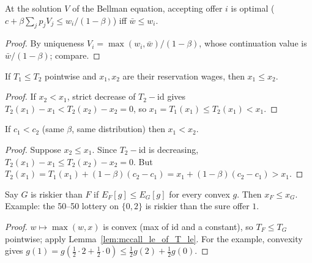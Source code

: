 \begin{theorem}
\label{thm:mccall_accept_iff}
\leanok
{}
At the solution $V$ of the Bellman equation, accepting offer $i$ is optimal
($c + \beta\sum_j p_j V_j \le w_i/(1-\beta)$) iff $\bar w \le w_i$.
\end{theorem}
\begin{proof}
\leanok
By uniqueness $V_i = \max(w_i, \bar w)/(1-\beta)$, whose continuation value is $\bar w/(1-\beta)$; compare.
\end{proof}

\begin{lemma}
\label{lem:mccall_le_of_T_le}
\leanok
{}
If $T_1 \le T_2$ pointwise and $x_1, x_2$ are their reservation wages, then $x_1 \le x_2$.
\end{lemma}
\begin{proof}
\leanok
If $x_2 < x_1$, strict decrease of $T_2 - \mathrm{id}$ gives $T_2(x_1) - x_1 < T_2(x_2) - x_2 = 0$, so
$x_1 = T_1(x_1) \le T_2(x_1) < x_1$.
\end{proof}

\begin{theorem}
\label{thm:mccall_strictMono_c}
\leanok
{}
If $c_1 < c_2$ (same $\beta$, same distribution) then $x_1 < x_2$.
\end{theorem}
\begin{proof}
\leanok
Suppose $x_2 \le x_1$. Since $T_2 - \mathrm{id}$ is decreasing, $T_2(x_1) - x_1 \le T_2(x_2) - x_2 = 0$. But
$T_2(x_1) = T_1(x_1) + (1-\beta)(c_2 - c_1) = x_1 + (1-\beta)(c_2 - c_1) > x_1$.
\end{proof}

\begin{theorem}
\label{thm:mccall_riskier}
\leanok
{}
Say $G$ is riskier than $F$ if $E_F[g] \le E_G[g]$ for every convex $g$. Then $x_F \le x_G$. Example: the 50--50
lottery on $\{0, 2\}$ is riskier than the sure offer $1$.
\end{theorem}
\begin{proof}
\leanok
$w \mapsto \max(w, x)$ is convex (max of $\mathrm{id}$ and a constant), so $T_F \le T_G$ pointwise; apply
Lemma~\ref{lem:mccall_le_of_T_le}. For the example, convexity gives
$g(1) = g(\tfrac12 \cdot 2 + \tfrac12 \cdot 0) \le \tfrac12 g(2) + \tfrac12 g(0)$.
\end{proof}

